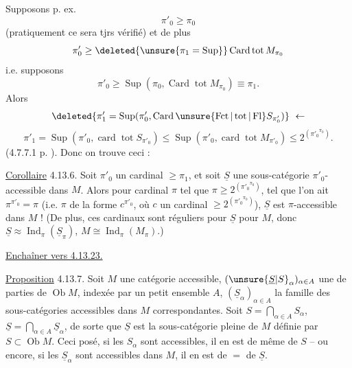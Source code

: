 Supposons p. ex.
\[
\pi'_0\geq\pi_0
\]
(pratiquement ce sera tjrs vérifié) et de plus
\[
\pi'_0\geq\deleted{\unsure{\pi_1=\operatorname{Sup}}}\operatorname{Card}\operatorname{tot}M_{\pi_0}
\]
i.e. supposons
\[
\pi'_0\geq\operatorname{Sup}(\pi_0,\operatorname{Card}\operatorname{tot} M_{\pi_0})\equiv\pi_1.
\]
Alors 
\[
\deleted{\pi'_1=\operatorname{Sup}(\pi'_0,\operatorname{Card}\unsure{\operatorname{Fct}|\operatorname{tot}|\operatorname{Fl}}S_{\pi'_0})}\ \leftarrow
\]
\[
\pi'_1=\operatorname{Sup}(\pi'_0,\operatorname{card}\operatorname{tot}S_{\pi'_0})\leq\operatorname{Sup}(\pi'_0,\operatorname{card}\operatorname{tot}M_{\pi'_0})\leq 2^{({\pi'_0}^{\pi_0})}.
\]
(4.7.7.1 p. ). Donc on trouve ceci :

\uline{Corollaire} 4.13.6. Soit $\pi'_0$ un cardinal $\geq\pi_1$,
et soit $\underline S$ une sous-catégorie $\pi'_0$-accessible
dans $M$. Alors pour  cardinal $\pi$
tel que $\pi\geq 2^{({\pi'_0}^{\pi_0})}$,  tel que l'on
ait $\pi^{\pi'_0}=\pi$ (i.e. $\pi$ de la forme
$c^{\pi'_0}$, où $c$ un cardinal $\geq 2^{({\pi'_0}^{\pi_0})}$),
$\underline S$ est $\pi$-accessible dans $M$ ! (De plus,
ces cardinaux sont réguliers pour $\underline S$ 
pour $M$, donc $\underline S\approx\operatorname{Ind}_{\pi}(\underline S_{\pi})$, $M\cong\operatorname{Ind}_{\pi}(M_\pi)$.)

\uline{Enchaîner vers  4.13.23. }


\uline{Proposition} 4.13.7. Soit $M$ une catégorie accessible,
$(\unsure{\underline S|S}_\alpha)_{\alpha\in A}$ une  de parties de $\operatorname{Ob}M$,
indexée par un petit ensemble $A$, $(\underline S_\alpha)_{\alpha\in A}$
la famille des sous-catégories accessibles dans $M$
correspondantes. Soit $S=\bigcap_{\alpha\in A}S_\alpha$, $\underline S=\bigcap_{\alpha\in A}\underline S_\alpha$, de
sorte que $\underline S$ est la sous-catégorie pleine de
$M$ définie par $S\subset\operatorname{Ob}M$. Ceci posé, si les
$S_\alpha$ sont accessibles, il en est de même
de $S$ -- ou encore, si les $\underline S_\alpha$ sont accessibles
dans $M$, il en est de $=$ de $\underline S$.

